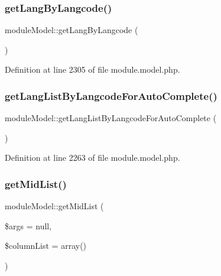 \subsubsection{\texorpdfstring{get\+Lang\+By\+Langcode()}{getLangByLangcode()}}
{\footnotesize\ttfamily module\+Model\+::get\+Lang\+By\+Langcode (\begin{DoxyParamCaption}{ }\end{DoxyParamCaption})}



Definition at line 2305 of file module.\+model.\+php.

\mbox{\label{classmoduleModel_aa0e34c0fdc868595793b10b6b4534c74}} 
\subsubsection{\texorpdfstring{get\+Lang\+List\+By\+Langcode\+For\+Auto\+Complete()}{getLangListByLangcodeForAutoComplete()}}
{\footnotesize\ttfamily module\+Model\+::get\+Lang\+List\+By\+Langcode\+For\+Auto\+Complete (\begin{DoxyParamCaption}{ }\end{DoxyParamCaption})}



Definition at line 2263 of file module.\+model.\+php.

\mbox{\label{classmoduleModel_a455828df6cdf405ba9b77d242faf8651}} 
\subsubsection{\texorpdfstring{get\+Mid\+List()}{getMidList()}}
{\footnotesize\ttfamily module\+Model\+::get\+Mid\+List (\begin{DoxyParamCaption}\item[{}]{\$args = {\ttfamily null},  }\item[{}]{\$column\+List = {\ttfamily array()} }\end{DoxyParamCaption})}




